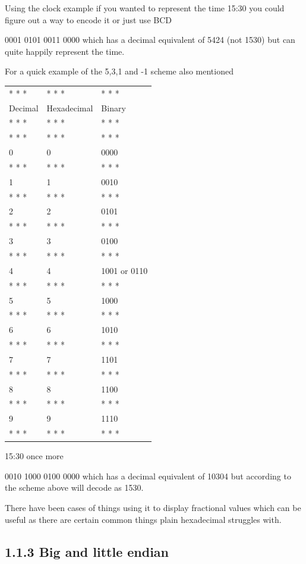 \documentclass[
]{book}
\begin{document}
Using the clock example if you wanted to represent the time 15:30 you could figure out a way to encode it or just use BCD

0001 0101 0011 0000 which has a decimal equivalent of 5424 (not 1530) but can quite happily represent the time.

For a quick example of the 5,3,1 and -1 scheme also mentioned

\begin{longtable}[]{@{}lll@{}}
\toprule()
\endhead
* * * & * * * & * * * \\
Decimal & Hexadecimal & Binary \\
* * * & * * * & * * * \\
* * * & * * * & * * * \\
0 & 0 & 0000 \\
* * * & * * * & * * * \\
1 & 1 & 0010 \\
* * * & * * * & * * * \\
2 & 2 & 0101 \\
* * * & * * * & * * * \\
3 & 3 & 0100 \\
* * * & * * * & * * * \\
4 & 4 & 1001 or 0110 \\
* * * & * * * & * * * \\
5 & 5 & 1000 \\
* * * & * * * & * * * \\
6 & 6 & 1010 \\
* * * & * * * & * * * \\
7 & 7 & 1101 \\
* * * & * * * & * * * \\
8 & 8 & 1100 \\
* * * & * * * & * * * \\
9 & 9 & 1110 \\
* * * & * * * & * * * \\
\bottomrule()
\end{longtable}

15:30 once more

0010 1000 0100 0000 which has a decimal equivalent of 10304 but according to the scheme above will decode as 1530.

There have been cases of things using it to display fractional values which can be useful as there are certain common things plain hexadecimal struggles with.

\hypertarget{big-and-little-endian}{%
\subsection{1.1.3 Big and little endian}\label{big-and-little-endian}}
\end{document}
